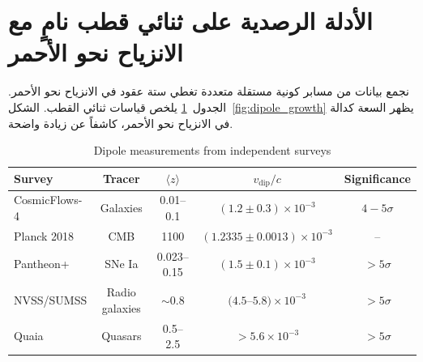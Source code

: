 \documentclass[12pt,a4paper]{article}
\begin{document}
	\section{الأدلة الرصدية على ثنائي قطب نامٍ مع الانزياح نحو الأحمر}
	
	نجمع بيانات من مسابر كونية مستقلة متعددة تغطي ستة عقود في الانزياح نحو الأحمر. الجدول~\ref{tab:dipoles} يلخص قياسات ثنائي القطب. الشكل~\ref{fig:dipole_growth} يظهر السعة كدالة في الانزياح نحو الأحمر، كاشفاً عن زيادة واضحة.
	
	\begin{otherlanguage}{english}
		\begin{table}[htbp]
			\centering
			\caption{Dipole measurements from independent surveys}
			\label{tab:dipoles}
			\begin{tabular}{lcccc}
				\toprule
				\textbf{Survey} & \textbf{Tracer} & \(\langle z \rangle\) & \(v_{\text{dip}}/c\) & \textbf{Significance} \\
				\midrule
				CosmicFlows-4 \cite{Watkins2023} & Galaxies & 0.01--0.1 & \((1.2 \pm 0.3) \times 10^{-3}\) & \(4-5\sigma\) \\
				Planck 2018 \cite{Planck2018VII} & CMB & 1100 & \((1.2335 \pm 0.0013) \times 10^{-3}\) & -- \\
				Pantheon+ \cite{Sah2025} & SNe Ia & 0.023--0.15 & \((1.5 \pm 0.1) \times 10^{-3}\) & \(>5\sigma\) \\
				NVSS/SUMSS \cite{Colin2017} & Radio galaxies & \(\sim0.8\) & \((4.5\)--\(5.8) \times 10^{-3}\) & \(>5\sigma\) \\
				Quaia \cite{Secrest2025} & Quasars & 0.5--2.5 & \(>5.6 \times 10^{-3}\) & \(>5\sigma\) \\
				\bottomrule
			\end{tabular}
		\end{table}
	\end{otherlanguage}
	
\end{document}
